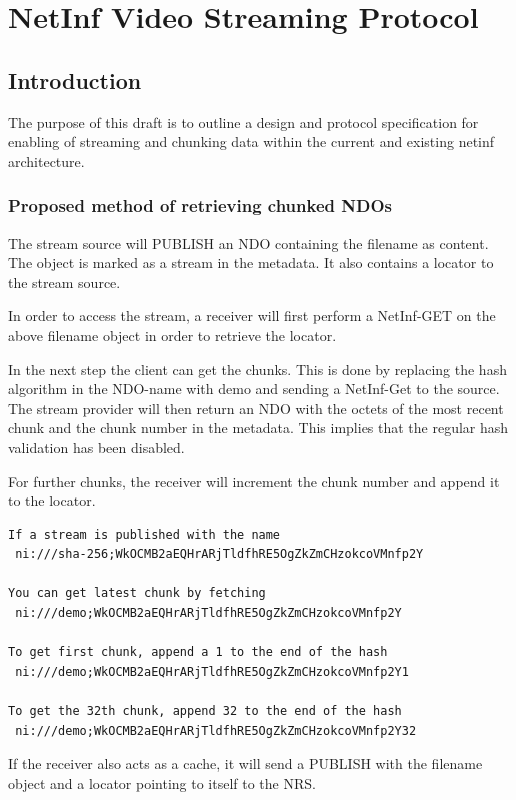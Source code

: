 \section {NetInf Video Streaming Protocol}\label{VideoDraft}

\subsection{Introduction}

The purpose of this draft is to outline a design and protocol specification for enabling of streaming and chunking data within the current and existing netinf architecture.

\subsubsection{Proposed method of retrieving chunked NDOs}

The stream source will PUBLISH an NDO containing the filename as content. The object is marked as a stream in the metadata. It also contains a locator to the stream source.

In order to access the stream, a receiver will first perform a NetInf-GET on the above filename object in order to retrieve the locator. 

In the next step the client can get the chunks. This is done by replacing the hash algorithm in the NDO-name with demo and sending a NetInf-Get to the source. The stream provider will then return an NDO with the octets of the most recent chunk and the chunk number in the metadata. This implies that the regular hash validation has been disabled.

For further chunks, the receiver will increment the chunk number and append it to the locator.
\begin{verbatim}
If a stream is published with the name
 ni:///sha-256;WkOCMB2aEQHrARjTldfhRE5OgZkZmCHzokcoVMnfp2Y

You can get latest chunk by fetching
 ni:///demo;WkOCMB2aEQHrARjTldfhRE5OgZkZmCHzokcoVMnfp2Y

To get first chunk, append a 1 to the end of the hash
 ni:///demo;WkOCMB2aEQHrARjTldfhRE5OgZkZmCHzokcoVMnfp2Y1

To get the 32th chunk, append 32 to the end of the hash
 ni:///demo;WkOCMB2aEQHrARjTldfhRE5OgZkZmCHzokcoVMnfp2Y32
\end{verbatim}
 
If the receiver also acts as a cache, it will send a PUBLISH with the filename object and a locator pointing to itself to the NRS.
\\

